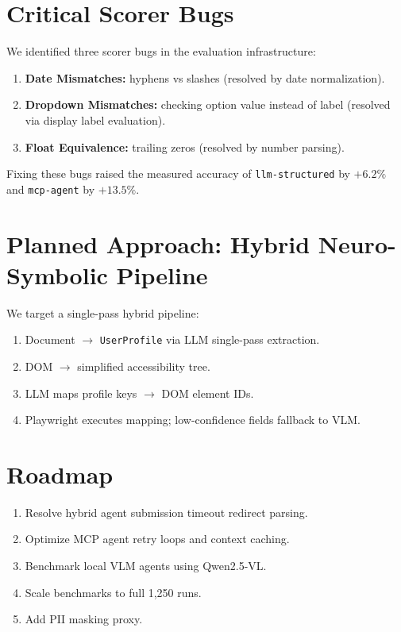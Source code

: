\documentclass[conference]{IEEEtran}
\begin{document}
\section{Critical Scorer Bugs}
We identified three scorer bugs in the evaluation infrastructure:
\begin{enumerate}
  \item \textbf{Date Mismatches:} hyphens vs slashes (resolved by date normalization).
  \item \textbf{Dropdown Mismatches:} checking option value instead of label (resolved via display label evaluation).
  \item \textbf{Float Equivalence:} trailing zeros (resolved by number parsing).
\end{enumerate}
Fixing these bugs raised the measured accuracy of \texttt{llm-structured} by $+6.2\%$ and \texttt{mcp-agent} by $+13.5\%$.

\section{Planned Approach: Hybrid Neuro-Symbolic Pipeline}
We target a single-pass hybrid pipeline:
\begin{enumerate}
  \item Document $\to$ \texttt{UserProfile} via LLM single-pass extraction.
  \item DOM $\to$ simplified accessibility tree.
  \item LLM maps profile keys $\to$ DOM element IDs.
  \item Playwright executes mapping; low-confidence fields fallback to VLM.
\end{enumerate}

\section{Roadmap}
\begin{enumerate}
  \item Resolve hybrid agent submission timeout redirect parsing.
  \item Optimize MCP agent retry loops and context caching.
  \item Benchmark local VLM agents using Qwen2.5-VL.
  \item Scale benchmarks to full 1,250 runs.
  \item Add PII masking proxy.
\end{enumerate}
\end{document}
